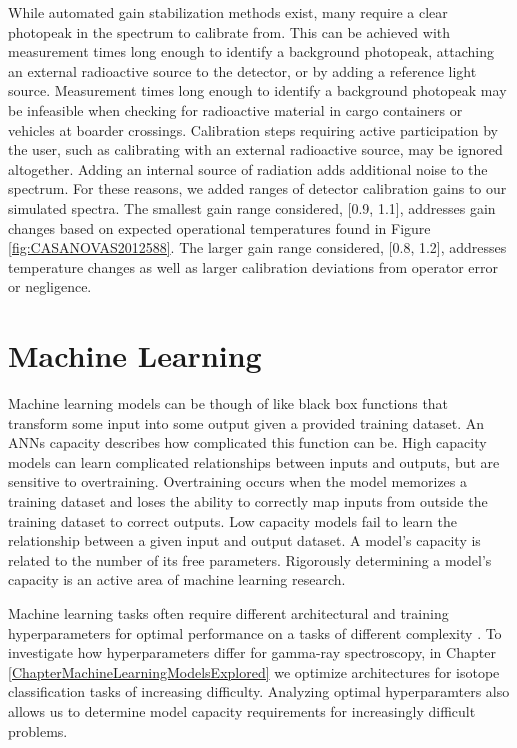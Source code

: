 While automated gain stabilization methods exist, many require a clear photopeak in the spectrum to calibrate from. This can be achieved with measurement times long enough to identify a background photopeak, attaching an external radioactive source to the detector, or by adding a reference light source. Measurement times long enough to identify a background photopeak may be infeasible when checking for radioactive material in cargo containers or vehicles at boarder crossings. Calibration steps requiring active participation by the user, such as calibrating with an external radioactive source, may be ignored altogether. Adding an internal source of radiation adds additional noise to the spectrum. For these reasons, we added ranges of detector calibration gains to our simulated spectra. The smallest gain range considered, [0.9, 1.1], addresses gain changes based on expected operational temperatures found in Figure \ref{fig:CASANOVAS2012588}. The larger gain range considered, [0.8, 1.2], addresses temperature changes as well as larger calibration deviations from operator error or negligence.


\section{Machine Learning}

Machine learning models can be though of like black box functions that transform some input into some output given a provided training dataset. An ANNs capacity describes how complicated this function can be. High capacity models can learn complicated relationships between inputs and outputs, but are sensitive to overtraining. Overtraining occurs when the model memorizes a training dataset and loses the ability to correctly map inputs from outside the training dataset to correct outputs. Low capacity models fail to learn the relationship between a given input and output dataset. A model's capacity is related to the number of its free parameters. Rigorously determining a model's capacity is an active area of machine learning research. 

Machine learning tasks often require different architectural and training hyperparameters for optimal performance on a tasks of different complexity \cite{Bergstra2012}. To investigate how hyperparameters differ for gamma-ray spectroscopy, in Chapter \ref{ChapterMachineLearningModelsExplored} we optimize architectures for isotope classification tasks of increasing difficulty. Analyzing optimal hyperparamters also allows us to determine model capacity requirements for increasingly difficult problems.

